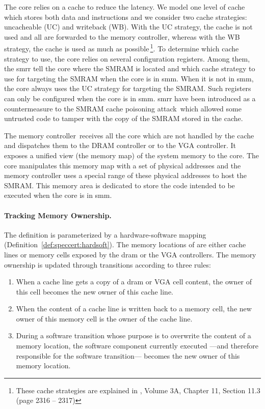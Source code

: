 The core relies on a cache to reduce the \IO latency.
%
We model one level of cache which stores both data and instructions and we
consider two cache strategies: uncacheable (UC) and writeback (WB).
%
With the UC strategy, the cache is not used and all \IOs are forwarded to the
memory controller, whereas with the WB strategy, the cache is used as much as
possible\,\footnote{These cache strategies are explained in
  \cite{intel2014manual}, Volume 3A, Chapter 11, Section 11.3 (page 2316 --
  2317)}.
%
To determine which cache strategy to use, the core relies on several
configuration registers.
%
Among them, the \ac{smrr} tell the core where the SMRAM is located and which
cache strategy to use for \IO targeting the SMRAM when the core is in \ac{smm}.
%
When it is not in \ac{smm}, the core always uses the UC strategy for \IO
targeting the SMRAM.
%
Such registers can only be configured when the core is in \ac{smm}.
%
\ac{smrr} have been introduced as a countermeasure to the SMRAM cache poisoning
attack\,\cite{wojtczuk2009smram,duflot2009smram} which allowed some untrusted
code to tamper with the copy of the SMRAM stored in the cache.
%

The memory controller\,\cite{intel2009mch} receives all the core \IOs which are
not handled by the cache and dispatches them to the DRAM controller or to the
VGA controller.
%
It exposes a unified view (the memory map) of the system memory to the core.
%
The core manipulates this memory map with a set of physical addresses and the
memory controller uses a special range of these physical addresses to host the
SMRAM.
%
This memory area is dedicated to store the code intended to be executed when the
core is in \ac{smm}.

\paragraph{Tracking Memory Ownership.}
%
The  definition is parameterized by a hardware-software
mapping  (Definition~\ref{def:speccert:hardsoft}).
%
The memory locations of  are either cache lines or memory
cells exposed by the \ac{dram} or the VGA controllers.
%
The memory ownership is updated through transitions according to three rules:
%
\begin{enumerate}
\item When a cache line gets a copy of a \ac{dram} or VGA cell content, the
  owner of this cell becomes the new owner of this cache line.
%
\item When the content of a cache line is written back to a memory cell, the new
  owner of this memory cell is the owner of the cache line.
%
\item During a software transition whose purpose is to overwrite the content of
  a memory location, the software component currently executed ---and therefore
  responsible for the software transition--- becomes the new owner of this
  memory location.
%
\end{enumerate}

